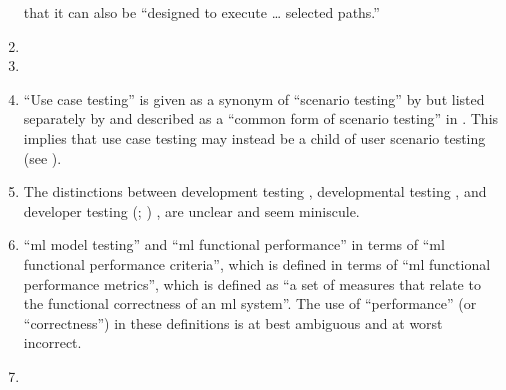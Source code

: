 \begin{enumerate}
          \citet[p.~316]{IEEE2017}  that it can also be
          ``designed to execute \dots{} selected paths.''
    \item %
          \tourFlaw{}
    \item %
          \alphaFlaw{}
    \item %
          ``Use case testing'' is given as a synonym of ``scenario testing''
          by \citetISTQB{}
          but listed separately by
          \citet[Fig.~2]{IEEE2022} and described as a ``common form of scenario
          testing'' in \citeyearpar[p.~20]{IEEE2021}.
          This implies that use case testing may instead be a child of
          user scenario testing (see ).
    \item %
          The distinctions between development testing \citep[p.~136]{IEEE2017},
          developmental testing \citep[p.~30]{Firesmith2015}, and developer
          testing
          \ifnotpaper
              (\citealp[p.~39]{Firesmith2015}; \citealp[p.~11]{Gerrard2000a})
          \else
              \cite[p.~39]{Firesmith2015}, \cite[p.~11]{Gerrard2000a}
          \fi are unclear and seem miniscule.
    \item %
           \citetISTQB{} 
          ``\acf{ml} model testing'' and ``\acs{ml} functional performance''
          in terms of ``\acs{ml} functional performance criteria'',
          which is defined in terms of ``\acs{ml} functional performance
          metrics'', which is defined as ``a set of measures that relate to the
          functional correctness of an \acs{ml} system''. The use
          of ``performance'' (or ``correctness'') in these definitions is at
          best ambiguous and at worst incorrect.
    \item %

\end{enumerate}
